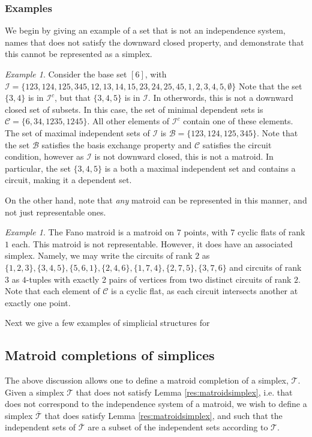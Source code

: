 \documentclass[11pt]{article}
\newcommand{\sanote}{\todo[color=violet!30]}
\newcommand{\sI}{\mathscr{I}}
\newcommand{\cI}{\mathcal{I}}
\newcommand{\sC}{\mathscr{C}}
\newcommand{\cB}{\mathcal{B}}
\newcommand{\cT}{\mathcal{T}}
\theoremstyle{remark}
\newtheorem{eg}[thm]{Example}
\theoremstyle{definition}
\begin{document}
\subsubsection{Examples \label{sec:egs}} \sanote{work in progress}
We begin by giving  an example of a set that is not an independence system, names that does not satisfy the downward closed property, and demonstrate that this cannot be represented as a simplex.

\begin{eg}\label{eg:notasystem}
Consider the base set $[6]$, with $\sI = \{123, 124, 125, 345, 12, 13, 14, 15, 23, 24, 25, 45, 1, 2, 3, 4, 5, \emptyset \}$ Note that the set $\{3,4\}$ is in $\sI^c$, but that $\{3,4,5\}$ is in $\cI$. In otherwords, this is not a downward closed set of subsets. In this case, the set of minimal dependent sets is $\sC = \{6, 34, 1235, 1245\}$. All other elements of $\sI^c$ contain one of these elements. The set of maximal independent sets of $\sI$ is $\cB = \{123, 124, 125, 345\}$. Note that the set $\cB$ satisfies the basis exchange property and $\sC$ satisfies the circuit condition, however as $\sI$ is not downward closed, this is not a matroid. In particular, the set $\{3, 4, 5\}$ is a both a maximal independent set and contains a circuit, making it a dependent set. \sanote{needs a pict}
\end{eg}

On the other hand, note that \emph{any} matroid can be represented in this manner, and not just representable ones.

\begin{eg}
The Fano matroid is a matroid on $7$ points, with $7$ cyclic flats of rank $1$ each. This matroid is not representable. However, it does have an associated simplex. Namely, we may write the circuits of rank $2$  as $\{1, 2, 3\}, \{ 3, 4,5\}, \{5, 6,1\}, \{2, 4, 6\}, \{1, 7, 4\}, \{2, 7, 5\}, \{3, 7, 6\}$ and circuits of rank $3$ as $4$-tuples with exactly 2 pairs of vertices from two distinct circuits of rank $2$. Note that each element of $\sC$ is a cyclic flat, as each circuit intersects another at exactly one point.  
\end{eg}

Next we give a few examples of simplicial structures for 

\subsection{Matroid completions of simplices}

The above discussion allows one to define a matroid completion of a simplex, $\cT$. Given a simplex $\cT$ that does not satisfy Lemma \eqref{res:matroidsimplex}, i.e. that does not correspond to the independence system of a matroid, we wish to define a simplex $\overline{\cT}$ that does satisfy Lemma \eqref{res:matroidsimplex}, and such that the independent sets of $\overline{\cT}$ are a subset of the independent sets according to $\cT$.
\end{document}
